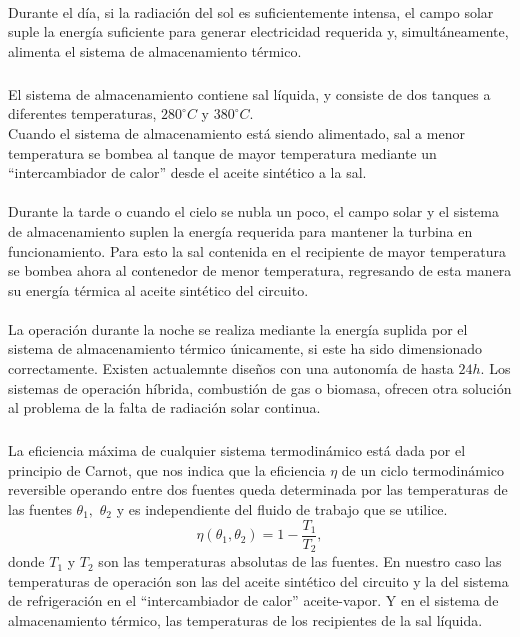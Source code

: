 \documentclass{article}
\theoremstyle{definition} \newtheorem{defi}{Definici\'on}
\theoremstyle{definition} \newtheorem{teo}{Teorema}
\theoremstyle{definition} \newtheorem{cor}{Corolario}
\begin{document}
\paragraph{}
Durante el d\'ia, si la radiaci\'on del sol es suficientemente intensa, el campo solar suple la energ\'ia suficiente para generar electricidad requerida y, simult\'aneamente, alimenta el sistema de almacenamiento t\'ermico.
\subparagraph{}
El sistema de almacenamiento contiene sal l\'iquida, y consiste de dos tanques a diferentes temperaturas, $280^\circ C$ y $380^\circ C.$\\
Cuando el sistema de almacenamiento est\'a siendo alimentado, sal a menor temperatura se bombea al tanque de mayor temperatura mediante un ``intercambiador de calor'' desde el aceite sint\'etico a la sal.
\paragraph{}
Durante la tarde o cuando el cielo se nubla un poco, el campo solar y el sistema de almacenamiento suplen la energ\'ia requerida para mantener la turbina en funcionamiento. Para esto la sal contenida en el recipiente de mayor temperatura se bombea ahora al contenedor de menor temperatura, regresando de esta manera su energ\'ia t\'ermica al aceite sint\'etico del circuito.
\paragraph{}
La operaci\'on durante la noche se realiza mediante la energ\'ia suplida por el sistema de almacenamiento t\'ermico \'unicamente, si este ha sido dimensionado correctamente. Existen actualemnte dise\~nos con una autonom\'ia de hasta $24h.$ Los sistemas de operaci\'on h\'ibrida, combusti\'on de gas o biomasa, ofrecen otra soluci\'on al problema de la falta de radiaci\'on solar continua.
\subparagraph{}
La eficiencia m\'axima de cualquier sistema termodin\'amico est\'a dada por el principio de Carnot, que nos indica que la eficiencia $\eta$ de un ciclo termodin\'amico reversible operando entre dos fuentes queda determinada por las temperaturas de las fuentes $\theta_1,$ $\theta_2$ y es independiente del fluido de trabajo que se utilice.
$$\eta(\theta_1,\theta_2)=1-\frac{T_1}{T_2},$$
donde $T_1$ y $T_2$ son las temperaturas absolutas de las fuentes. En nuestro caso las temperaturas de operaci\'on son las del aceite sint\'etico del circuito y la del sistema de refrigeraci\'on en el ``intercambiador de calor'' aceite-vapor. Y en el sistema de almacenamiento t\'ermico, las temperaturas de los recipientes de la sal l\'iquida.
\end{document}
